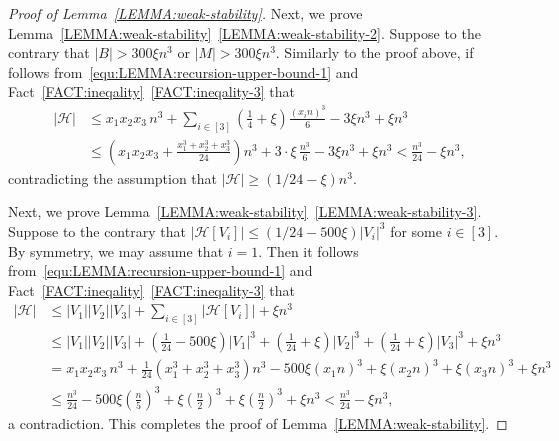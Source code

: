 \documentclass[10pt,a4paper]{amsart}
\newcommand{\C}[1]{\mathcal{#1}}
\begin{document}
\begin{proof}[Proof of Lemma~\ref{LEMMA:weak-stability}]
Next, we prove Lemma~\ref{LEMMA:weak-stability}~\ref{LEMMA:weak-stability-2}. 
Suppose to the contrary that $|B| >  300 \xi n^{3}$ or $|M| > 300 \xi n^{3}$. 
Similarly to the proof above, if follows from~\eqref{equ:LEMMA:recursion-upper-bound-1} and Fact~\ref{FACT:ineqality}~\ref{FACT:ineqality-3} that 
    \begin{align*}
        |\mathcal{H}|
        & \le x_1 x_2 x_3\, n^3 + \sum_{i\in [3]} \left(\frac{1}{4} + \xi \right) \frac{(x_in)^3}{6} - 3\xi n^3 + \xi n^3 \\
        & \le \left(x_1 x_2 x_3 + \frac{x_1^3 + x_2^3 + x_3^3}{24}\right) n^3 + 3\cdot \xi\, \frac{n^3}{6} - 3\xi n^3 + \xi n^3  
        < \frac{n^3}{24}  - \xi n^3, 
    \end{align*}
    contradicting the assumption that $|\mathcal{H}| \ge (1/24 - \xi)n^3$. 

    Next, we prove Lemma~\ref{LEMMA:weak-stability}~\ref{LEMMA:weak-stability-3}.
    Suppose to the contrary that $|\mathcal{H}[V_i]| \le (1/24 - 500\xi) |V_i|^3$ for some $i \in [3]$. 
    By symmetry, we may assume that $i =1$. 
    Then it follows from~\eqref{equ:LEMMA:recursion-upper-bound-1} and Fact~\ref{FACT:ineqality}~\ref{FACT:ineqality-3} that
        \begin{align*}
            |\mathcal{H}|
            & \le |V_1||V_2||V_3| + \sum_{i\in [3]}|\mathcal{H}[V_i]| +\xi n^3 \\
            & \le |V_1||V_2||V_3|  + \left(\frac{1}{24} - 500\xi \right) |V_1|^3 + \left(\frac{1}{24} +\xi \right) |V_2|^3 + \left(\frac{1}{24} + \xi \right) |V_3|^3 +\xi n^3\\
            & = x_1 x_2 x_3\, n^3 + \frac{1}{24}\left(x_1^3 + x_2^3 + x_3^3\right)n^3 - 500\xi (x_1 n)^3 + \xi(x_2 n)^3 + \xi(x_3 n)^3  + \xi n^3\\
            & \le \frac{n^3}{24} - 500\xi \left(\frac{n}{5}\right)^3 + \xi \left(\frac{n}{2}\right)^3 + \xi \left(\frac{n}{2}\right)^3  + \xi n^3
            < \frac{n^3}{24} - \xi n^3, 
        \end{align*}
        a contradiction. This completes the proof of Lemma~\ref{LEMMA:weak-stability}. 
\end{proof}%
\end{document}
